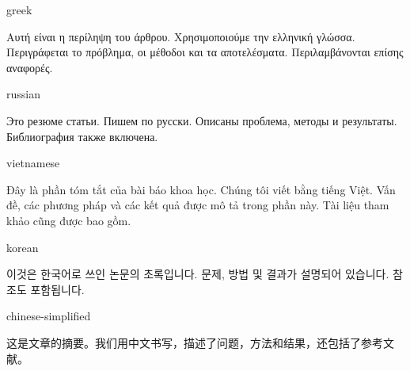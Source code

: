 \documentclass[balance,upint,subscriptcorrection,varvw,mathalfa=cal=boondoxo,spanish,french,vietnamese,russian,greek,pdf-a,fontspec,colorlinks]{asmeconf}
\begin{document}
\iffontspecloaded %
%
    \begin{selectlanguage}{greek}%
    \begin{abstract*}
    Αυτή είναι η περίληψη του άρθρου. Χρησιμοποιούμε την ελληνική γλώσσα. Περιγράφεται το πρόβλημα, οι μέθοδοι και τα αποτελέσματα. Περιλαμβάνονται επίσης αναφορές.
    \end{abstract*}
    \end{selectlanguage}%
%    
    \begin{selectlanguage}{russian}
    \begin{abstract*}
    Это резюме статьи. Пишем по русски. Описаны проблема, методы и результаты. Библиография также включена.%
    \end{abstract*}
    \end{selectlanguage}%
%
    \begin{selectlanguage}{vietnamese}
    \begin{abstract*}
    Đây là phần tóm tắt của bài báo khoa học. Chúng tôi viết bằng tiếng Việt. Vấn đề, các phương pháp và các kết quả được mô tả trong phần này. Tài liệu tham khảo cũng được bao gồm.
    \end{abstract*}
    \end{selectlanguage}%
%
%
    \begin{selectlanguage}{korean}
    \begin{abstract*}
    이것은 한국어로 쓰인 논문의 초록입니다. 문제, 방법 및 결과가 설명되어 있습니다. 참조도 포함됩니다.
    \end{abstract*}
    \end{selectlanguage}%
%
    \begin{selectlanguage}{chinese-simplified}
    \begin{abstract*}
    这是文章的摘要。我们用中文书写，描述了问题，方法和结果，还包括了参考文献。
    \end{abstract*}
    \end{selectlanguage}%
%
\fi

\end{document}
